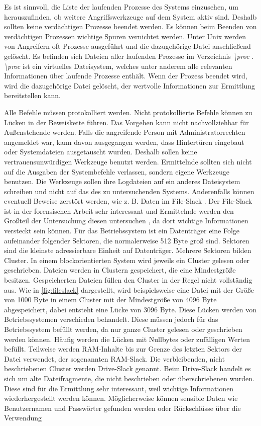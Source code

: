 \documentclass[12pt,DIV=14, version=first, BCOR=10mm,a4paper,twoside,parskip=half-,headsepline,headinclude]{scrartcl}
\begin{document}
        Es ist sinnvoll, die Liste der laufenden Prozesse des Systems einzusehen, um herauszufinden, ob weitere Angriffswerkzeuge auf dem System aktiv sind. Deshalb sollten keine verdächtigen Prozesse beendet werden. Es können beim Beenden von verdächtigen Prozessen wichtige Spuren vernichtet werden. Unter Unix werden von Angreifern oft Prozesse ausgeführt und die dazugehörige Datei anschließend gelöscht. Es befinden sich Dateien aller laufenden Prozesse im Verzeichnis \textit{\textbackslash proc} \cite[vgl. S. 86-87]{texbook01}. \textit{\textbackslash proc} ist ein virtuelles Dateisystem, welches unter anderem alle relevanten Informationen über laufende Prozesse enthält. Wenn der Prozess beendet wird, wird die dazugehörige Datei gelöscht, der wertvolle Informationen zur Ermittlung bereitstellen kann. 
        
        Alle Befehle müssen protokolliert werden. Nicht protokollierte Befehle können zu Lücken in der Beweiskette führen. Das Vorgehen kann nicht nachvollziehbar für Außenstehende werden. Falls die angreifende Person mit Administratorrechten angemeldet war, kann davon ausgegangen werden, dass Hintertüren eingebaut oder Systemdateien ausgetauscht wurden. Deshalb sollen keine vertrauensunwürdigen Werkzeuge benutzt werden. Ermittelnde sollten sich nicht auf die Ausgaben der Systembefehle verlassen, sondern eigene Werkzeuge benutzen. Die Werkzeuge sollen ihre Logdateien auf ein anderes Dateisystem schreiben und nicht auf das des zu untersuchenden Systems. Anderenfalls können eventuell Beweise zerstört werden, wie z. B. Daten im File-Slack \cite[vgl. S. 87]{texbook01}. Der File-Slack ist in der forensischen Arbeit sehr interessant und Ermittelnde werden den Großteil der Untersuchung diesen untersuchen \cite[vgl. S. 138]{texbook04}, da dort wichtige Informationen versteckt sein können. Für das Betriebssystem ist ein Datenträger eine Folge aufeinander folgender Sektoren, die normalerweise 512 Byte groß sind. Sektoren sind die kleinste adressierbare Einheit auf Datenträger. Mehrere Sektoren bilden Cluster. In einem blockorientierten System wird jeweils ein Cluster gelesen oder geschrieben. Dateien werden in Clustern gespeichert, die eine Mindestgröße besitzen. Gespeicherten Dateien füllen den Cluster in der Regel nicht vollständig aus. Wie in \autoref{fig:fileslack} dargestellt, wird beispielsweise eine Datei mit der Größe von 1000 Byte in einem Cluster mit der Mindestgröße von 4096 Byte abgespeichert, dabei entsteht eine Lücke von 3096 Byte. Diese Lücken werden von Betriebssystemen verschieden behandelt. Diese müssen jedoch für das Betriebssystem befüllt werden, da nur ganze Cluster gelesen oder geschrieben werden können. Häufig werden die Lücken mit Nullbytes oder zufälligen Werten befüllt. Teilweise werden RAM-Inhalte bis zur Grenze des letzten Sektors der Datei verwendet, der sogenannten RAM-Slack. Die verbleibenden, nicht beschriebenen Cluster werden Drive-Slack genannt. Beim Drive-Slack handelt es sich um alte Dateifragmente, die nicht beschrieben oder überschriebenen wurden. Diese sind für die Ermittlung sehr interessant, weil wichtige Informationen wiederhergestellt werden können. Möglicherweise können sensible Daten wie Benutzernamen und Passwörter gefunden werden oder Rückschlüsse über die Verwendung 
\end{document}
